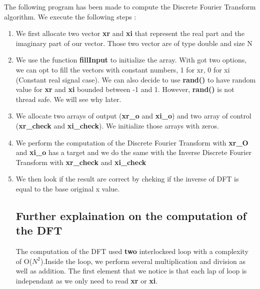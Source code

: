 \documentclass{rapport}
\begin{document}
The following program has been made to compute the Discrete Fourier Transform algorithm.
We execute the following steps : 
\begin{enumerate}
	\item We first allocate two vector \textbf{xr} and \textbf{xi} that represent the real part and the imaginary part of our vector. Those two vector are of type double and size N
	\item We use the function \textbf{fillInput} to initialize the array. With got two options, we can opt to fill the vectors with constant numbers, 1 for xr, 0 for xi (Constant real signal case). We can also decide to use \textbf{rand()} to have random value for \textbf{xr} and \textbf{xi} bounded between -1 and 1. However, \textbf{rand()} is not thread safe. We will see why later. 
	\item We allocate two arrays of output (\textbf{xr_o} and \textbf{xi_o}) and two array of control (\textbf{xr_check} and \textbf{xi_check}). We initialize those arrays with zeros.
	\item We perform the computation of the Discrete Fourier Transform with \textbf{xr_O} and \textbf{xi_o} has a target and we do the same with the Inverse Discrete Fourier Transform with \textbf{xr_check} and \textbf{xi_check} 
	
	\item We then look if the result are correct by cheking if the inverse of DFT is equal to the base original x value.
	
\subsection{Further explaination on the computation of the DFT}

The computation of the DFT used \textbf{two} interlockeed loop with a complexity of O($N^{2}$).Inside the loop,  we perform several multiplication and division as well as addition. The first element that we notice is that each lap of loop is independant as we only need to read \textbf{xr} or \textbf{xi}.
	
\end{enumerate}
\end{document}
